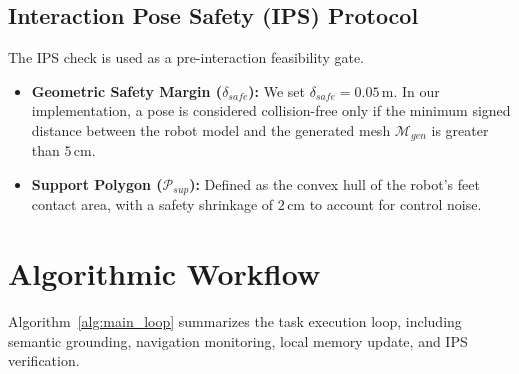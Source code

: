 \documentclass[conference]{IEEEtran}
\begin{document}
\subsection{Interaction Pose Safety (IPS) Protocol}
The IPS check is used as a pre-interaction feasibility gate.
\begin{itemize}
    \item \textbf{Geometric Safety Margin ($\delta_{safe}$):} We set $\delta_{safe} = 0.05\,\text{m}$. In our implementation, a pose is considered collision-free only if the minimum signed distance between the robot model and the generated mesh $\mathcal{M}_{gen}$ is greater than $5\,\text{cm}$.
    \item \textbf{Support Polygon ($\mathcal{P}_{sup}$):} Defined as the convex hull of the robot's feet contact area, with a safety shrinkage of $2\,\text{cm}$ to account for control noise.
\end{itemize}

\section{Algorithmic Workflow}
\label{sec:algo_workflow}

Algorithm~\ref{alg:main_loop} summarizes the task execution loop, including semantic grounding, navigation monitoring, local memory update, and IPS verification.
\end{document}
